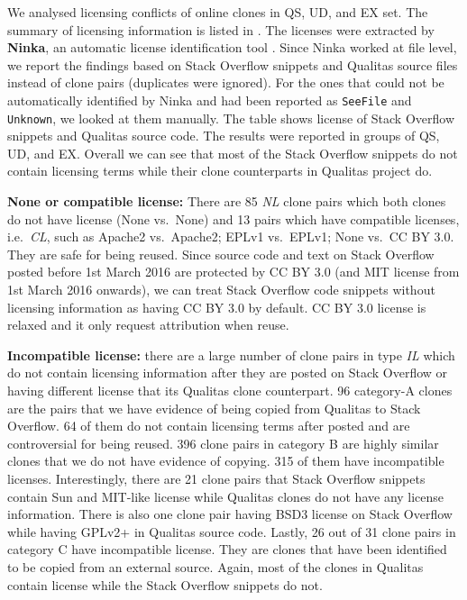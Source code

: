 \documentclass[sigconf,review, anonymous]{acmart}
\begin{document}
We analysed licensing conflicts of online clones in QS, UD, and EX set. The summary of licensing information is listed in . The licenses were extracted by \textbf{Ninka}, an automatic license identification tool \cite{German2010}. Since Ninka worked at file level, we report the findings based on Stack Overflow snippets and Qualitas source files instead of clone pairs (duplicates were ignored). For the ones that could not be automatically identified by Ninka and had been reported as {\small\texttt{SeeFile}} and {\small\texttt{Unknown}}, we looked at them manually.  The table shows license of Stack Overflow snippets and Qualitas source code. The results were reported in groups of QS, UD, and EX. Overall we can see that most of the Stack Overflow snippets do not contain licensing terms while their clone counterparts in Qualitas project do. 

\textbf{None or compatible license:} There are 85 \textit{NL} clone pairs which both clones do not have license (None vs.~None) and 13 pairs which have compatible licenses, i.e.~\textit{CL}, such as Apache2 vs.~Apache2; EPLv1 vs.~EPLv1; None vs.~CC BY 3.0. They are safe for being reused. Since source code and text on Stack Overflow posted before 1st March 2016 are protected by CC BY 3.0 (and MIT license from 1st March 2016 onwards), we can treat Stack Overflow code snippets without licensing information as having CC BY 3.0 by default. CC BY 3.0 license is relaxed and it only request attribution when reuse. 

\textbf{Incompatible license:} there are a large number of clone pairs in type \textit{IL} which do not contain licensing information after they are posted on Stack Overflow or having different license that its Qualitas clone counterpart. 96 category-A clones are the pairs that we have evidence of being copied from Qualitas to Stack Overflow. 64 of them do not contain licensing terms after posted and are controversial for being reused. 396 clone pairs in category B are highly similar clones that we do not have evidence of copying. 315 of them have incompatible licenses. Interestingly, there are 21 clone pairs that Stack Overflow snippets contain Sun and MIT-like license while Qualitas clones do not have any license information. There is also one clone pair having BSD3 license on Stack Overflow while having GPLv2+ in Qualitas source code. Lastly, 26 out of 31 clone pairs in category C have incompatible license. They are clones that have been identified to be copied from an external source. Again, most of the clones in Qualitas contain license while the Stack Overflow snippets do not. 
\end{document}
